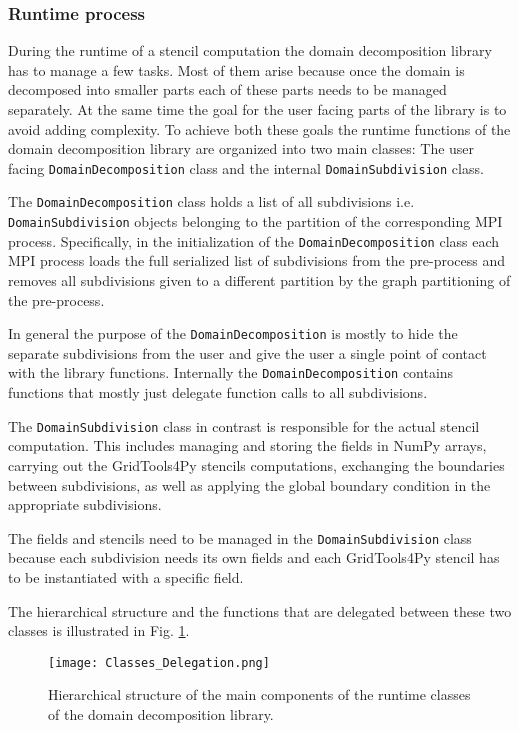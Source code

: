 \subsubsection{Runtime process}
\label{sec:runtime_process}
During the runtime of a stencil computation the domain decomposition library has to manage a few tasks.
Most of them arise because once the domain is decomposed into smaller parts each of these parts needs to be managed separately.
At the same time the goal for the user facing parts of the library is to avoid adding complexity.
To achieve both these goals the runtime functions of the domain decomposition library are organized into two main classes:
The user facing \texttt{DomainDecomposition} class and the internal \texttt{DomainSubdivision} class.

The \texttt{DomainDecomposition} class holds a list of all subdivisions i.e. \texttt{DomainSubdivision} objects belonging to the partition of the corresponding MPI process.
Specifically, in the initialization of the \texttt{DomainDecomposition} class each MPI process loads the full serialized list of subdivisions from the pre-process and removes all subdivisions given to a different partition by the graph partitioning of the pre-process.

In general the purpose of the \texttt{DomainDecomposition} is mostly to hide the separate subdivisions from the user and give the user a single point of contact with the library functions.
Internally the \texttt{DomainDecomposition} contains functions that mostly just delegate function calls to all subdivisions.

The \texttt{DomainSubdivision} class in contrast is responsible for the actual stencil computation.
This includes managing and storing the fields in NumPy arrays, carrying out the GridTools4Py stencils computations, exchanging the boundaries between subdivisions, as well as applying the global boundary condition in the appropriate subdivisions.

The fields and stencils need to be managed in the \texttt{DomainSubdivision} class because each subdivision needs its own fields and each GridTools4Py stencil has to be instantiated with a specific field.

The hierarchical structure and the functions that are delegated between these two classes is illustrated in Fig. \ref{fig:classes_chart}.

\begin{figure}
\centering
\texttt{[image: Classes\_Delegation.png]}
\caption{Hierarchical structure of the main components of the runtime classes of the domain decomposition library.}
\label{fig:classes_chart}
\end{figure}


